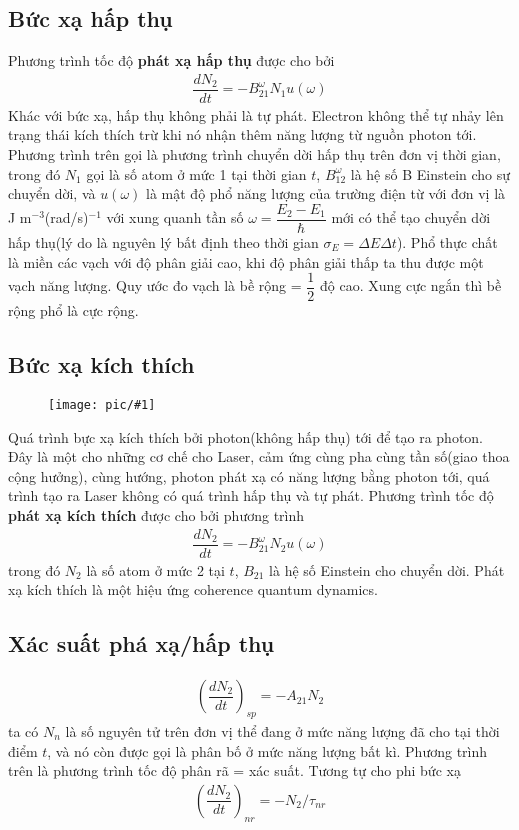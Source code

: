 \documentclass{report}
\newcommand{\image}[1]{
\begin{figure}[H]
	\centering
	\texttt{[image: pic/\#1]}
	\label{#1}
\end{figure}
}
\newcommand{\f}[2]{\dfrac{#1}{#2}}
\begin{document}
\subsection{Bức xạ hấp thụ}
Phương trình tốc độ \textbf{phát xạ hấp thụ} được cho bởi
\begin{gather}
	\f{dN_{2}}{dt} = -B_{21}^{\omega} N_{1} u(\omega)
\end{gather}
Khác với bức xạ, hấp thụ không phải là tự phát. Electron không thể tự nhảy lên trạng thái kích thích trừ khi nó nhận thêm năng lượng từ nguồn photon tới. Phương trình trên gọi là phương trình chuyển dời hấp thụ trên đơn vị thời gian, trong đó $N_{1}$ gọi là số atom ở mức 1 tại thời gian $t$, $B_{12}^{\omega}$ là hệ số B Einstein cho sự chuyển dời, và $u(\omega)$ là mật độ phổ năng lượng của trường điện từ với đơn vị là J m$^{-3}$(rad/s)$^{-1}$ với xung quanh tần số $\omega = \f{E_{2} - E_{1}}{\hbar}$ mới có thể tạo chuyển dời hấp thụ(lý do là nguyên lý bất định theo thời gian $\sigma_{E} = \Delta E \Delta t$). Phổ thực chất là miền các vạch với độ phân giải cao, khi độ phân giải thấp ta thu được một vạch năng lượng. Quy ước đo vạch là bề rộng = $\f{1}{2}$ độ cao. Xung cực ngắn thì bề rộng phổ là cực rộng.
\subsection{Bức xạ kích thích}
\image{kichthich.png}
Quá trình bực xạ kích thích bởi photon(không hấp thụ) tới để tạo ra photon. Đây là một cho những cơ chế cho Laser, cảm ứng cùng pha cùng tần số(giao thoa cộng hưởng), cùng hướng, photon phát xạ có năng lượng bằng photon tới, quá trình tạo ra Laser không có quá trình hấp thụ và tự phát. Phương trình tốc độ \textbf{phát xạ kích thích} được cho bởi phương trình
\begin{gather}
	\f{dN_{2}}{dt} = - B_{21}^{\omega} N_{2} u(\omega)
\end{gather}
trong đó $N_{2}$ là số atom ở mức 2 tại $t$, $B_{21}$ là hệ số Einstein cho chuyển dời. Phát xạ kích thích là một hiệu ứng coherence quantum dynamics.
\subsection{Xác suất phá xạ/hấp thụ}
\begin{gather}
	\left( \f{dN_{2}}{dt} \right)_{sp} = - A_{21} N_{2}
\end{gather}
ta có $N_{n}$ là số nguyên tử trên đơn vị thể đang ở mức năng lượng đã cho tại thời điểm $t$, và nó còn được gọi là phân bố ở mức năng lượng bất kì. Phương trình trên là phương trình tốc độ phân rã = xác suất. Tương tự cho phi bức xạ
\begin{gather}
	\left( \f{dN_{2}}{dt} \right)_{nr} =  - N_{2} / \tau_{nr}
\end{gather}
\end{document}

